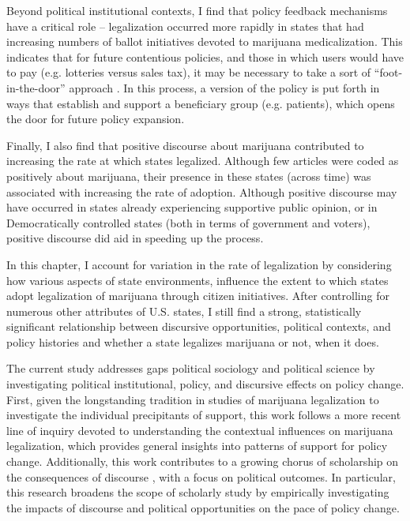 Beyond political institutional contexts, I find that policy feedback mechanisms have a critical role -- legalization occurred more rapidly in states that had increasing numbers of ballot initiatives devoted to marijuana medicalization. This indicates that for future contentious policies, and those in which users would have to pay (e.g. lotteries versus sales tax), it may be necessary to take a sort of ``foot-in-the-door'' approach \citep{cialdini_1984,freedman_and_fraser_1966}. In this process, a version of the policy is put forth in ways that establish and support a beneficiary group (e.g. patients), which opens the door for future policy expansion. 

Finally, I also find that positive discourse about marijuana contributed to increasing the rate at which states legalized. Although few articles were coded as positively about marijuana, their presence in these states (across time) was associated with increasing the rate of adoption. Although positive discourse may have occurred in states already experiencing supportive public opinion, or in Democratically controlled states (both in terms of government and voters), positive discourse did aid in speeding up the process. 

In this chapter, I account for variation in the rate of legalization by considering how various aspects of state environments, influence the extent to which states adopt legalization of marijuana through citizen initiatives. After controlling for numerous other attributes of U.S. states, I still find a strong, statistically significant relationship between discursive opportunities, political contexts, and policy histories and whether a state legalizes marijuana or not, when it does. 

The current study addresses gaps political sociology and political science by investigating  political institutional, policy, and discursive effects on policy change. First, given the longstanding tradition in studies of marijuana legalization to investigate the individual precipitants of support, this work follows a more recent line of inquiry devoted to understanding the contextual influences on marijuana legalization, which provides general insights into patterns of support for policy change. Additionally, this work contributes to a growing chorus of scholarship on the consequences of discourse \citep{bail_2012,vasi_et_al_2015}, with a focus on political outcomes. In particular, this research broadens the scope of scholarly study by empirically investigating the impacts of discourse and political opportunities on the pace of policy change. 

